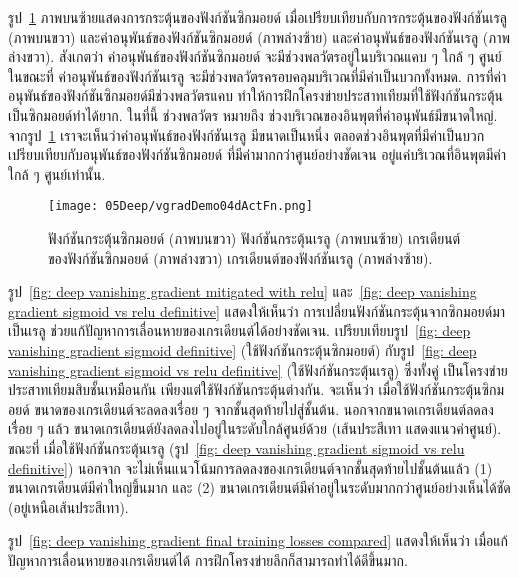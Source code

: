 รูป~\ref{fig: deep activations and gradients} ภาพบนซ้ายแสดงการกระตุ้นของฟังก์ชันซิกมอยด์ เมื่อเปรียบเทียบกับการกระตุ้นของฟังก์ชันเรลู (ภาพบนขวา)
และค่าอนุพันธ์ของฟังก์ชันซิกมอยด์ (ภาพล่างซ้าย) และค่าอนุพันธ์ของฟังก์ชันเรลู (ภาพล่างขวา).
สังเกตว่า ค่าอนุพันธ์ของฟังก์ชันซิกมอยด์ จะมีช่วงพลวัตรอยู่ในบริเวณแคบ ๆ ใกล้ ๆ ศูนย์ 
ในขณะที่ ค่าอนุพันธ์ของฟังก์ชันเรลู
จะมีช่วงพลวัตรครอบคลุมบริเวณที่มีค่าเป็นบวกทั้งหมด.
การที่ค่าอนุพันธ์ของฟังก์ชันซิกมอยด์มีช่วงพลวัตรแคบ 
ทำให้การฝึกโครงข่ายประสาทเทียมที่ใช้ฟังก์ชันกระตุ้นเป็นซิกมอยด์ทำได้ยาก.
ในที่นี้ ช่วงพลวัตร หมายถึง ช่วงบริเวณของอินพุตที่ค่าอนุพันธ์มีขนาดใหญ่.
จากรูป~\ref{fig: deep activations and gradients} 
เราจะเห็นว่าค่าอนุพันธ์ของฟังก์ชันเรลู มีขนาดเป็นหนึ่ง ตลอดช่วงอินพุตที่มีค่าเป็นบวก 
เปรียบเทียบกับอนุพันธ์ของฟังก์ชันซิกมอยด์
ที่มีค่ามากกว่าศูนย์อย่างชัดเจน อยู่แค่บริเวณที่อินพุตมีค่าใกล้ ๆ ศูนย์เท่านั้น.

%
\begin{figure}
\begin{center}
\texttt{[image: 05Deep/vgradDemo04dActFn.png]}
\end{center}
\caption[ฟังก์ชันกระตุ้นต่าง ๆ]{ฟังก์ชันกระตุ้นซิกมอยด์ (ภาพบนขวา) ฟังก์ชันกระตุ้นเรลู (ภาพบนซ้าย) เกรเดียนต์ของฟังก์ชันซิกมอยด์ (ภาพล่างขวา) เกรเดียนต์ของฟังก์ชันเรลู (ภาพล่างซ้าย).}
\label{fig: deep activations and gradients}
\end{figure}
%

รูป~\ref{fig: deep vanishing gradient mitigated with relu}
และ~\ref{fig: deep vanishing gradient sigmoid vs relu definitive}
แสดงให้เห็นว่า
การเปลี่ยนฟังก์ชันกระตุ้นจากซิกมอยด์มาเป็นเรลู ช่วยแก้ปัญหาการเลื่อนหายของเกรเดียนต์ได้อย่างชัดเจน.
%
เปรียบเทียบรูป~\ref{fig: deep vanishing gradient sigmoid definitive} (ใช้ฟังก์ชันกระตุ้นซิกมอยด์)
กับรูป~\ref{fig: deep vanishing gradient sigmoid vs relu definitive} (ใช้ฟังก์ชันกระตุ้นเรลู)
ซึ่งทั้งคู่ เป็นโครงข่ายประสาทเทียมสิบชั้นเหมือนกัน เพียงแต่ใช้ฟังก์ชันกระตุ้นต่างกัน.
จะเห็นว่า
เมื่อใช้ฟังก์ชันกระตุ้นซิกมอยด์
ขนาดของเกรเดียนต์จะลดลงเรื่อย ๆ จากชั้นสุดท้ายไปสู่ชั้นต้น.
นอกจากขนาดเกรเดียนต์ลดลงเรื่อย ๆ แล้ว ขนาดเกรเดียนต์ยังลดลงไปอยู่ในระดับใกล้ศูนย์ด้วย (เส้นประสีเทา แสดงแนวค่าศูนย์).
ขณะที่ เมื่อใช้ฟังก์ชันกระตุ้นเรลู (รูป~\ref{fig: deep vanishing gradient sigmoid vs relu definitive})
นอกจาก จะไม่เห็นแนวโน้มการลดลงของเกรเดียนต์จากชั้นสุดท้ายไปชั้นต้นแล้ว
(1) ขนาดเกรเดียนต์มีค่าใหญ่ขึ้นมาก
และ (2) ขนาดเกรเดียนต์มีค่าอยู่ในระดับมากกว่าศูนย์อย่างเห็นได้ชัด (อยู่เหนือเส้นประสีเทา).

รูป~\ref{fig: deep vanishing gradient final training losses compared}
แสดงให้เห็นว่า เมื่อแก้ปัญหาการเลื่อนหายของเกรเดียนต์ได้ 
การฝึกโครงข่ายลึกก็สามารถทำได้ดีขึ้นมาก.

